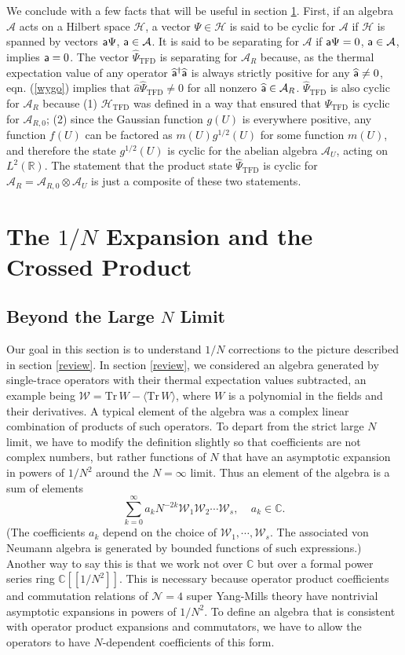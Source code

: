 \documentclass[11pt,a4paper]{article}
\def\a{{\sf a}}
\def\be{\begin{equation}}
\def\ee{\end{equation}}
\def\h{\widehat}
\def\A{{\mathcal A}}
\def\R{{\mathbb R}}
\def\C{{\mathbb C}}
\def\U{{ U}}
\def\N{{\mathcal N}}
\def\h{\widehat}
\def\W{{\mathcal W}}
\def\la{\langle}
\def\ra{\rangle}
\def\H{{\mathcal H}}
\def\Tr{\mathrm{Tr}}
\def\TFD{{\mathrm{TFD}}}
\begin{document}
We conclude with a few facts that will be useful in section \ref{crossed}.   First, if an algebra $\A$ acts on a Hilbert space $\H$, a vector $\Psi\in\H$
is said to be cyclic for $\A$ if $\H$ is spanned by vectors $\a\Psi$, $\a\in\A$.  It is said to be separating for $\A$ if $\a\Psi=0$, $\a\in\A$, implies $\a=0$.
The vector $\h\Psi_\TFD$ is separating for $\A_R$ because, as the thermal expectation value of any operator $\h\a^\dagger\h\a$ is always strictly positive
for any $\h\a\not=0$, eqn. (\ref{wygo}) implies that $\h a\h\Psi_\TFD\not=0$ for all nonzero $\h\a\in \A_R$.   $\h\Psi_\TFD$ is also cyclic for $\A_R$ because (1)
$\H_\TFD$ was defined in a way that ensured that $\Psi_\TFD$ is cyclic for $\A_{R,0}$; (2) since the Gaussian function $g(\U)$ is everywhere positive,
any function $f(\U)$ can be factored as $m(\U) g^{1/2}(\U)$ for some function $m(\U)$, and therefore the state $g^{1/2}(\U)$ is cyclic for the abelian
algebra $\A_\U$, acting on $L^2(\R)$.   The statement that the product state $\h\Psi_\TFD $ is cyclic for $\A_R=\A_{R,0}\otimes \A_\U$ 
is just a composite
of these two statements.







	




\section{The $1/N$ Expansion and the Crossed Product}\label{crossed}

\subsection{Beyond the Large $N$ Limit}\label{beyond}

Our goal in this section is to understand $1/N$ corrections to the picture described in section \ref{review}. 
In section \ref{review}, we considered an algebra generated by single-trace operators with their thermal expectation values subtracted, an example
being $\W=\Tr\,W-\la\Tr\, W\ra$, where $W$ is a polynomial in the fields and their derivatives.   A typical element of the algebra was a complex linear combination of products of such operators.  To depart from the strict large $N$
limit, we have to modify the definition slightly so that coefficients are not complex numbers, but rather functions of $N$ that have an asymptotic expansion 
in powers of $1/N^2$ around the $N=\infty$ limit.   Thus an element of the algebra is a sum of elements
\be\label{donkey} \sum_{k=0}^\infty a_k N^{-2k}\W_1\W_2\cdots \W_s,~~~~~a_k\in \C. \ee   (The  coefficients $a_k$ depend on the choice of 
$\W_1,\cdots,\W_s$.   The associated von Neumann algebra is generated by bounded functions of  such expressions.)   
Another way to say this is that we work not over $\C$ but over a formal power series ring $\C[[1/N^2]]$.
This is necessary because operator product coefficients and commutation relations of $\N=4$ super Yang-Mills theory have nontrivial asymptotic expansions
 in powers of $1/N^2$.   To define an algebra that is consistent with operator product expansions and commutators, we have to allow
the operators to have  $N$-dependent coefficients of this form.
\end{document}
